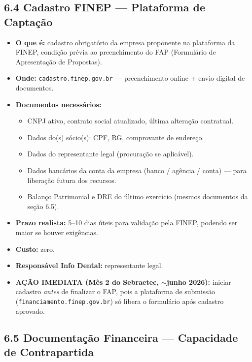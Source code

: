 \documentclass[11pt, a4paper]{article}
\begin{document}
\subsection{6.4 Cadastro FINEP --- Plataforma de Captação}

\begin{itemize}[label=\textcolor{primaryColor}{$\blacktriangleright$}, leftmargin=1.6em]
    \item \textbf{O que é:} cadastro obrigatório da empresa proponente na plataforma da FINEP, condição prévia ao preenchimento do FAP (Formulário de Apresentação de Propostas).
    \item \textbf{Onde:} \texttt{cadastro.finep.gov.br} --- preenchimento online + envio digital de documentos.
    \item \textbf{Documentos necessários:}
    \begin{itemize}[label=$\circ$, leftmargin=1.4em]
        \item CNPJ ativo, contrato social atualizado, última alteração contratual.
        \item Dados do(s) sócio(s): CPF, RG, comprovante de endereço.
        \item Dados do representante legal (procuração se aplicável).
        \item Dados bancários da conta da empresa (banco / agência / conta) --- para liberação futura dos recursos.
        \item Balanço Patrimonial e DRE do último exercício (mesmos documentos da seção 6.5).
    \end{itemize}
    \item \textbf{Prazo realista:} 5--10 dias úteis para validação pela FINEP, podendo ser maior se houver exigências.
    \item \textbf{Custo:} zero.
    \item \textbf{Responsável Info Dental:} representante legal.
    \item \textcolor{accentColor}{\textbf{AÇÃO IMEDIATA (Mês 2 do Sebraetec, $\sim$junho 2026):}} iniciar cadastro \emph{antes} de finalizar o FAP, pois a plataforma de submissão (\texttt{financiamento.finep.gov.br}) só libera o formulário após cadastro aprovado.
\end{itemize}

\subsection{6.5 Documentação Financeira --- Capacidade de Contrapartida}
\end{document}
